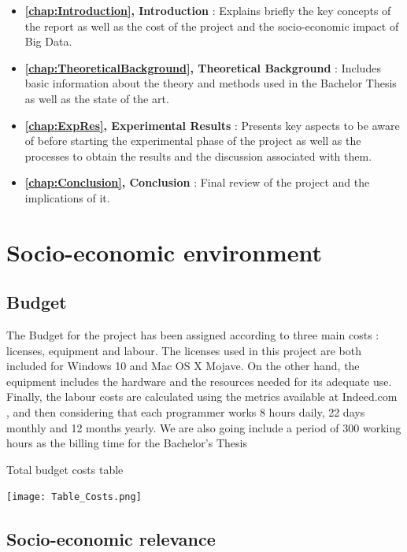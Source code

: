 \begin{itemize}
	\item \textbf{ \autoref{chap:Introduction}, Introduction} : Explains briefly the key concepts of the report as well as the cost of the project and the socio-economic impact of Big Data.
	
	\item \textbf{ \autoref{chap:TheoreticalBackground}, Theoretical Background} : Includes basic information about the theory and methods used in the Bachelor Thesis as well as the state of the art.
	
	\item \textbf{ \autoref{chap:ExpRes}, Experimental Results} : Presents key aspects to be aware of before starting the experimental phase of the project as well as the processes to obtain the results and the discussion associated with them.
	
	\item \textbf{ \autoref{chap:Conclusion}, Conclusion} : Final review of the project and the implications of it.
	
\end{itemize}

\section{Socio-economic environment}
\subsection{Budget}

The Budget for the project has been assigned according to three main costs : licenses, equipment and labour. The licenses used in this project are both included for Windows 10 and Mac OS X Mojave. On the other hand, the equipment includes the hardware and the resources needed for its adequate use. Finally, the labour costs are calculated using the metrics available at Indeed.com \cite{ProgrammerSalaries}, and then considering that each programmer works 8 hours daily, 22 days monthly and 12 months yearly. We are also going include a period of 300 working hours as the billing time for the Bachelor's Thesis \par
\begin{table}[H]
	\caption{Total budget costs table}
	\label{tbl:budget_table}
	\texttt{[image: Table\_Costs.png]}
\end{table}

\subsection{Socio-economic relevance}

